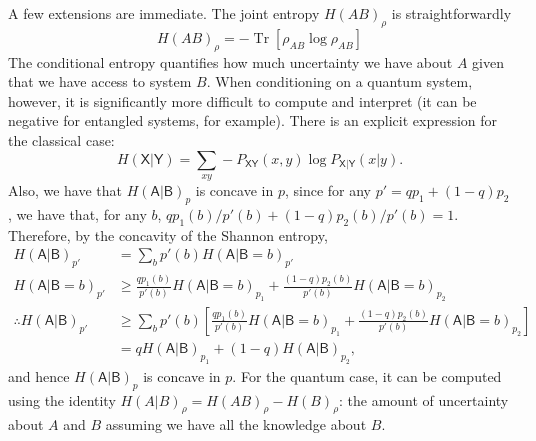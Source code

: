 \documentclass[10pt, a4paper]{article}
\numberwithin{equation}{section} %
\theoremstyle{definition}
\theoremstyle{plain}
\newcommand{\?}{\mathrel{?}} %
\newcommand{\Tr}[2][]{\mathop{\mathrm{Tr}#1}\left[ #2 \right]} %
\newcommand{\crv}[1]{\mathsf{#1}}
\begin{document}
\begin{appendices}
                    A few extensions are immediate. The joint entropy \(H{(AB)}_{\rho}\) is straightforwardly
                    \begin{equation}
                      H{(AB)}_{\rho} = -\Tr{\rho_{AB}\log\rho_{AB}}
                    \end{equation}
                    The conditional entropy quantifies how much uncertainty we have about \(A\) given that we have access to system \(B\). When conditioning on a quantum system, however, it is significantly more difficult to compute and interpret (it can be negative for entangled systems, for example). There is an explicit expression for the classical case:
                    \begin{equation}
                      H(\crv{X}|\crv{Y}) = \sum_{xy} - P_{\crv{XY}}(x,y) \log P_{\crv{X}|\crv{Y}}(x|y).
                    \end{equation}
                    Also, we have that \(H{(\crv{A}|\crv{B})}_p\) is concave in \(p\), since for any \(p' = qp_1 + (1-q)p_2\), we have that, for any \(b\), \(qp_1(b)/p'(b) + (1-q)p_2(b)/p'(b) = 1\). Therefore, by the concavity of the Shannon entropy,
                  \begin{align}
                    H{(\crv{A}|\crv{B})}_{p'} &= \sum_b p'(b) H{(\crv{A}|\crv{B}=b)}_{p'} \\
                    H{(\crv{A}|\crv{B}=b)}_{p'} &\geq \frac{qp_1(b)}{p'(b)}H{(\crv{A}|\crv{B}=b)}_{p_1} + \frac{(1-q)p_2(b)}{p'(b)}H{(\crv{A}|\crv{B}=b)}_{p_2} \\
                    \therefore H{(\crv{A}|\crv{B})}_{p'} &\geq \sum_b p'(b) \left[ \frac{qp_1(b)}{p'(b)}H{(\crv{A}|\crv{B}=b)}_{p_1} + \frac{(1-q)p_2(b)}{p'(b)}H{(\crv{A}|\crv{B}=b)}_{p_2} \right] \\
                                                         &= qH{(\crv{A}|\crv{B})}_{p_1} + (1-q)H{(\crv{A}|\crv{B})}_{p_2},
                  \end{align}
                  and hence \(H{(\crv{A}|\crv{B})}_p\) is concave in \(p\). For the quantum case, it can be computed using the identity \(H{(A|B)}_{\rho} = H{(AB)}_{\rho} - H{(B)}_{\rho}\): the amount of uncertainty about \(A\) and \(B\) assuming we have all the knowledge about \(B\).


\end{appendices}
\end{document}

